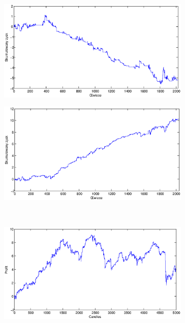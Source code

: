 \begin{figure}[h]
\centering
\begin{minipage}{.49\linewidth}
\centering
\includegraphics[width=0.82\textwidth]{images/S1a_silver.eps}
\label{jedno}
\end{minipage}
\begin{minipage}{.49\linewidth}
\centering
\includegraphics[width=0.82\textwidth]{images/S1b_silver.eps}
\label{dwu}
\end{minipage}
\\
\begin{minipage}{.49\linewidth}
\centering
\includegraphics[width=0.82\textwidth]{images/S1c_silver.eps}
\label{cztero}
\end{minipage}
\begin{minipage}{.49\linewidth}

\end{minipage}
\end{figure}
